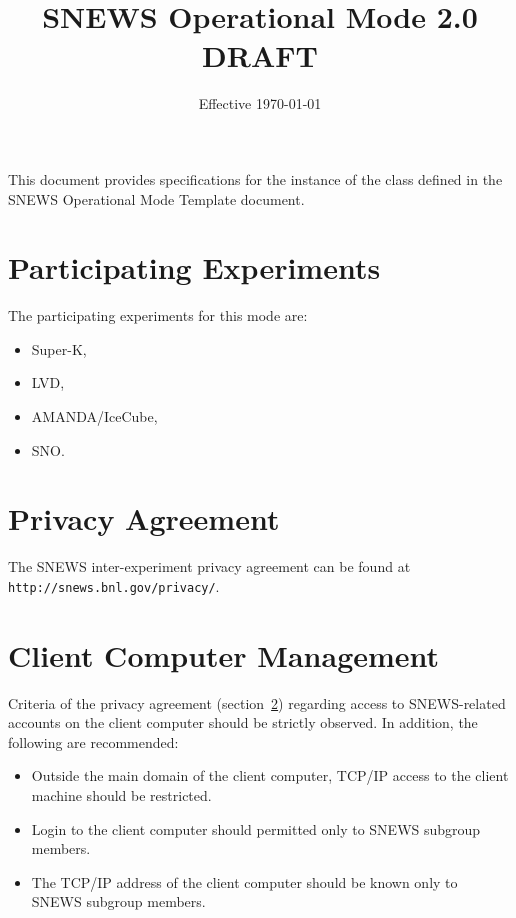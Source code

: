 \documentclass{article}
\begin{document}
\title{SNEWS Operational Mode 2.0 DRAFT}         
\date{Effective \today}
\maketitle

This document provides specifications for the instance of
the class defined in the SNEWS Operational Mode Template document.


\section{Participating Experiments}

The participating experiments for this mode are:

\begin{itemize}
\item Super-K,
\item LVD,
\item AMANDA/IceCube,
\item SNO.
\end{itemize}

\section{Privacy Agreement}\label{privacy}

The SNEWS inter-experiment privacy agreement can be found at \\
{\tt http://snews.bnl.gov/privacy/}.

\section{Client Computer Management}

Criteria of the privacy agreement (section~\ref{privacy}) regarding
access to SNEWS-related accounts on the client computer should be
strictly observed. In addition, the following are recommended:

\begin{itemize}
\item Outside the main domain of the 
client computer, TCP/IP access to the client machine should be restricted.
\item Login to the client computer should permitted only to SNEWS subgroup 
members.
\item The TCP/IP address of the client computer should be known only to 
SNEWS subgroup members.
\end{itemize}
\end{document}
